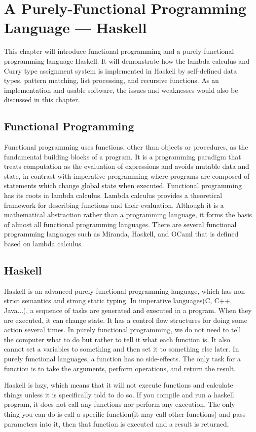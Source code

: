 \chapter{A Purely-Functional Programming Language --- Haskell}

This chapter will introduce functional programming and a purely-functional programming language-Haskell. It will demonstrate how the lambda calculus and Curry type assignment system is implemented in Haskell by self-defined data types, pattern matching, list processing, and recursive functions. As an implementation and usable software, the issues and weaknesses would also be discussed in this chapter. 
\section{Functional Programming}
Functional programming uses functions, other than objects or procedures, as the fundamental building blocks of a program. It is a programming paradigm that treats computation as the evaluation of expressions and avoids mutable data and state, in contrast with imperative programming where programs are composed of statements which change global state when executed. Functional programming has its roots in lambda calculus. Lambda calculus provides a theoretical framework for describing functions and their evaluation. Although it is a mathematical abstraction rather than a programming language, it forms the basis of almost all functional programming languages. There are several functional programming languages such as Miranda, Haskell, and OCaml that is defined based on lambda calculus. 
\section{Haskell}
Haskell is an advanced purely-functional programming language, which has non-strict semantics and strong static typing. In imperative languages(C, C++, Java...), a sequence of tasks are generated and executed in a program. When they are executed, it can change state. It has a control flow structures for doing some action several times. In purely functional programming, we do not need to tell the computer what to do but rather to tell it what each function is. It also cannot set a variables to something and then set it to something else later. In purely functional languages, a function has no side-effects. The only task for a function is to take the arguments, perform operations, and return the result.  

Haskell is lazy, which means that it will not execute functions and calculate things unless it is specifically told to do so. If you compile and run a haskell program, it does not call any functions nor perform any execution. The only thing you can do is call a specific function(it may call other functions) and pass parameters into it, then that function is executed and a result is returned.   

